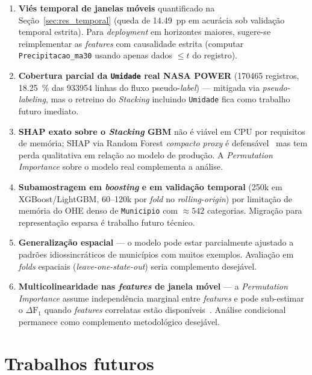 \begin{enumerate}
  \item \textbf{Viés temporal de janelas móveis} quantificado na Seção~\ref{sec:res_temporal} (queda de \SI{14,49}{pp} em acurácia sob validação temporal estrita). Para \emph{deployment} em horizontes maiores, sugere-se reimplementar as \emph{features} com causalidade estrita (computar \texttt{Precipitacao\_ma30} usando apenas dados \(\leq t\) do registro).

  \item \textbf{Cobertura parcial da \texttt{Umidade} real NASA POWER} (\num{170465} registros, \SI{18,25}{\percent} das \num{933954} linhas do fluxo pseudo-\emph{label}) --- mitigada via \emph{pseudo-labeling}, mas o retreino do \emph{Stacking} incluindo \texttt{Umidade} fica como trabalho futuro imediato.

  \item \textbf{SHAP exato sobre o \emph{Stacking} GBM} não é viável em CPU por requisitos de memória; SHAP via Random Forest \emph{compacto proxy} é defensável~\cite{lundberg2020local} mas tem perda qualitativa em relação ao modelo de produção. A \emph{Permutation Importance} sobre o modelo real complementa a análise.

  \item \textbf{Subamostragem em \emph{boosting} e em validação temporal} (250k em XGBoost/LightGBM, 60--120k por \emph{fold} no \emph{rolling-origin}) por limitação de memória do OHE denso de \texttt{Municipio} com \(\approx 542\) categorias. Migração para representação esparsa é trabalho futuro técnico.

  \item \textbf{Generalização espacial} --- o modelo pode estar parcialmente ajustado a padrões idiossincráticos de municípios com muitos exemplos. Avaliação em \emph{folds} espaciais (\emph{leave-one-state-out}) seria complemento desejável.

  \item \textbf{Multicolinearidade nas \emph{features} de janela móvel} --- a \emph{Permutation Importance} assume independência marginal entre \emph{features} e pode sub-estimar o \(\Delta \text{F}_1\) quando \emph{features} correlatas estão disponíveis~\cite{molnar2022interpretable}. Análise condicional~\cite{hooker2021unrestricted} permanece como complemento metodológico desejável.
\end{enumerate}

\section{Trabalhos futuros}
\label{sec:conclusao_futuros}

